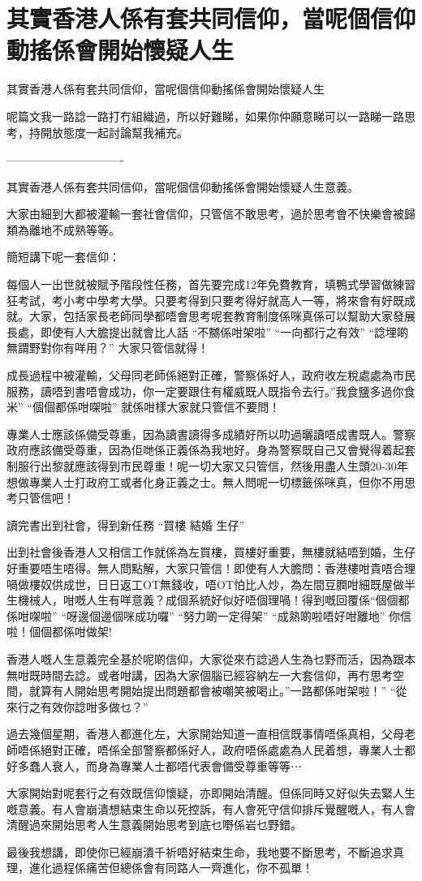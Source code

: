 \chapter{其實香港人係有套共同信仰，當呢個信仰動搖係會開始懷疑人生}

其實香港人係有套共同信仰，當呢個信仰動搖係會開始懷疑人生

呢篇文我一路諗一路打冇組織過，所以好難睇，如果你仲願意睇可以一路睇一路思考，持開放態度一起討論幫我補充。

——————————-

其實香港人係有套共同信仰，當呢個信仰動搖係會開始懷疑人生意義。

大家由細到大都被灌輸一套社會信仰，只管信不敢思考，過於思考會不快樂會被歸類為離地不成熟等等。

簡短講下呢一套信仰：

每個人一出世就被賦予階段性任務，首先要完成12年免費教育，填鴨式學習做練習狂考試，考小考中學考大學。只要考得到只要考得好就高人一等，將來會有好既成就。大家，包括家長老師同學都唔會思考呢套教育制度係咪真係可以幫助大家發展長處，即使有人大膽提出就會比人話 “不嬲係咁架啦” “一向都行之有效” “諗埋啲無謂野對你有咩用？” 大家只管信就得！

成長過程中被灌輸，父母同老師係絕對正確，警察係好人，政府收左稅處處為市民服務，讀唔到書唔會成功，你一定要跟住有權威既人既指令去行。”我食鹽多過你食米” “個個都係咁㗎啦” 就係咁樣大家就只管信不要問！

專業人士應該係備受尊重，因為讀書讀得多成績好所以叻過曬讀唔成書既人。警察政府應該備受尊重，因為佢哋係正義係為我地好。身為警察既自己又會覺得着起套制服行出黎就應該得到市民尊重！呢一切大家又只管信，然後用盡人生頭20-30年想做專業人士打政府工或者化身正義之士。無人問呢一切標籤係咪真，但你不用思考只管信吧！

讀完書出到社會，得到新任務 “買樓 結婚 生仔”

出到社會後香港人又相信工作就係為左買樓，買樓好重要，無樓就結唔到婚，生仔好重要唔生唔得。無人問點解，大家只管信！即使有人大膽問：香港樓咁貴唔合理喎做樓奴供成世，日日返工OT無錢收，唔OT怕比人炒，為左間豆膶咁細既屋做半生機械人，咁嘅人生有咩意義？成個系統好似好唔個理喎！得到嘅回覆係“個個都係咁㗎啦” “呀邊個邊個咪成功囉” “努力啲一定得架” “成熟啲啦唔好咁離地” 你信啦！個個都係咁做架!

香港人嘅人生意義完全基於呢啲信仰，大家從來冇諗過人生為乜野而活，因為跟本無咁既時間去諗。或者咁講，因為大家個腦已經容納左一大套信仰，再冇思考空間，就算有人開始思考開始提出問題都會被嘲笑被喝止。”一路都係咁架啦！” “從來行之有效你諗咁多做乜？”

過去幾個星期，香港人都進化左，大家開始知道一直相信既事情唔係真相，父母老師唔係絕對正確，唔係全部警察都係好人，政府唔係處處為人民着想，專業人士都好多蠢人衰人，而身為專業人士都唔代表會備受尊重等等⋯

大家開始對呢套行之有效既信仰懷疑，亦即開始清醒。但係同時又好似失去緊人生嘅意義。有人會崩潰想結束生命以死控訴，有人會死守信仰排斥覺醒嘅人，有人會清醒過來開始思考人生意義開始思考到底乜嘢係岩乜野錯。

最後我想講，即使你已經崩潰千祈唔好結束生命，我地要不斷思考，不斷追求真理，進化過程係痛苦但總係會有同路人一齊進化，你不孤單！

